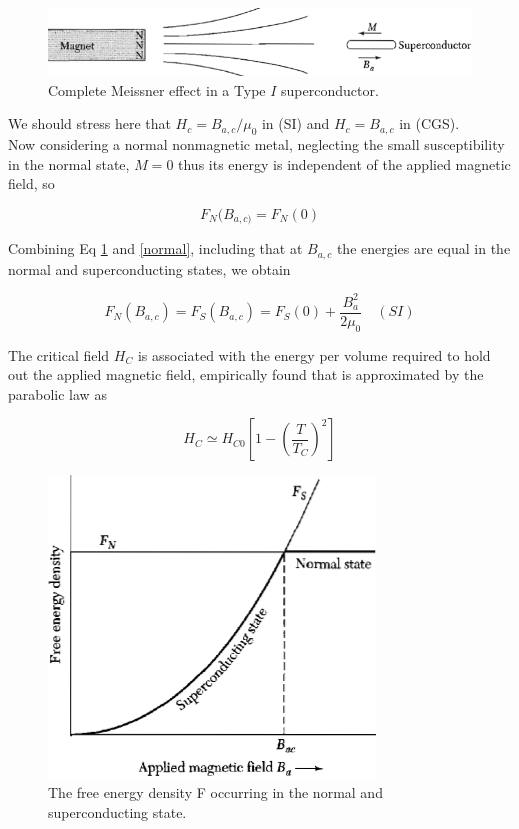\documentclass[openany,11pt,a4paper]{report}
\begin{document}
\begin{figure}[H]
\centering
\includegraphics[scale=0.6]{work.PNG}
\caption{Complete Meissner effect in a Type $I$ superconductor. \cite{kittel}}
\label{work}
\end{figure}

We should stress here that $H_{c}=B_{a,c}/ \mu_{0} $ in (SI) and $H_{c}=B_{a,c}$ in (CGS).\\

Now considering a normal nonmagnetic metal, neglecting the small
susceptibility in the normal state, $M = 0$ thus its energy is independent of the applied magnetic field, so 

\begin{equation}
F_{N}(B_{a,c)}=F_{N}(0)
\label{normal}
\end{equation}

Combining Eq \ref{work} and \ref{normal}, including that at $B_{a,c}$ the energies are equal in the normal and superconducting
states, we obtain

\begin{equation}
F_{N}(B_{a,c})= F_{S}(B_{a,c})= F_{S}(0) + \dfrac{B_{a}^{2}}{2 \mu_{0}} \quad (SI)
\label{freeE}
\end{equation}



 
The critical field $H_{C}$ is associated with the energy per volume required to hold out the applied magnetic field, empirically found that is approximated by the parabolic law as \cite{tinkham}

 
 \begin{equation}
H_{C}\simeq H_{C0} [1- (\dfrac{T}{T_{C}})^{2}]
\label{HC}
\end{equation}
 
 
 \begin{figure}[H]
\centering
\includegraphics[scale=.7]{freeEn.PNG}
\caption{The free energy density F occurring in the normal and superconducting state. \cite{kittel}}
\end{figure} 
 
\end{document}
